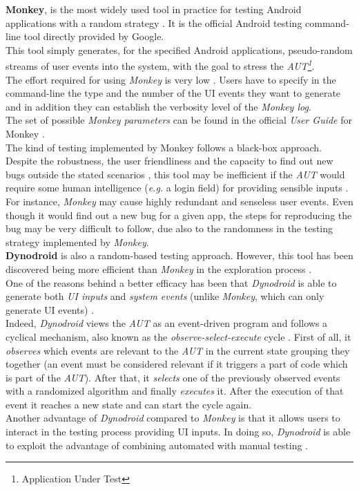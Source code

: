 \textbf{Monkey}, is the most widely used tool in practice for testing Android applications with a random strategy \cite{monkey}. It is the official Android testing command-line tool directly provided by Google. \\
This tool simply generates, for the specified Android applications, pseudo-random streams of user events into the system, with the goal to stress the \textit{AUT\footnote{Application Under Test}}\cite{monkey}. \\ 
The effort required for using \textit{Monkey} is very low \cite{areWeThereYet}. Users have to specify in the command-line the type and the number of the UI events they want to generate and in addition they can establish the verbosity level of the \textit{Monkey log}. \\
The set of possible \textit{Monkey parameters} can be found in the official \textit{User Guide} for Monkey \cite{monkey}. \\
The kind of testing implemented by Monkey follows a black-box approach. 
Despite the robustness, the user friendliness \cite{areWeThereYet, dynodroid} and the capacity to find out new bugs outside the stated scenarios  \cite{monkey_2}, this tool may be inefficient if the \textit{AUT} would require some human intelligence (\textit{e.g.} a login field) for providing sensible inputs \cite{dynodroid}. \\
For instance, \textit{Monkey} may cause highly redundant and senseless user events. Even though it would find out a new bug for a given app, the steps for reproducing the bug may be very difficult to follow, due also to the randomness in the testing strategy implemented by \textit{Monkey}\cite{monkey_2}. \\
\textbf{Dynodroid} \cite{dynodroid} is also a random-based testing approach. However, this tool has been discovered being more efficient than \textit{Monkey} in the exploration process  \cite{areWeThereYet}. \\
One of the reasons behind a better efficacy has been that \textit{Dynodroid} is able to generate both \textit{UI inputs} and \textit{system events} (unlike \textit{Monkey}, which can only generate UI events) \cite{areWeThereYet}. \\  
Indeed, \textit{Dynodroid} views the \textit{AUT} as an event-driven program and follows a cyclical mechanism, also known as the \textit{observe-select-execute} cycle \cite{dynodroid}. First of all, it \textit{observes} which events are relevant to the \textit{AUT} in the current state grouping they together (an event must be considered relevant if it triggers a part of code which is part of the \textit{AUT}). After that, it \textit{selects} one of the previously observed events with a randomized algorithm \cite{dynodroid, areWeThereYet} and finally \textit{executes} it. After the execution of that event it reaches a new state and can start the cycle again. \\
Another advantage of \textit{Dynodroid} compared to \textit{Monkey} is that it allows users to interact in the testing process providing UI inputs. In doing so, \textit{Dynodroid} is able to exploit the advantage of combining automated with manual testing \cite{dynodroid}.

